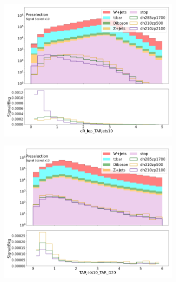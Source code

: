   \begin{figure}[htbp]
    \centering
     \begin{subfigure}{0.49\textwidth}
     \includegraphics[width = 0.98\textwidth]{Figures/appendix/Preselection/dR_lep_TARJets10.png}
     \caption{\drTARl}
     \end{subfigure}
     \begin{subfigure}{0.49\textwidth}
     \includegraphics[width = 0.98\textwidth]{Figures/appendix/Preselection/TARJets10_TAR_D20.png}
     \caption{\DtwoTAR}
     \end{subfigure}
     \begin{subfigure}{0.49\textwidth}

\end{subfigure}
\end{figure}
